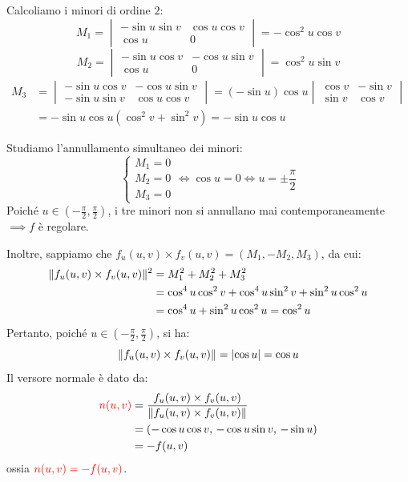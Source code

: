 \begin{esempio}
        Calcoliamo i minori di ordine $2$:
        \[
        M_1 = 
        \begin{vmatrix}
        -\sin u \sin v & \cos u \cos v \\[6pt]
        \cos u & 0
        \end{vmatrix} 
        = -\cos^2 u \cos v
        \]
        \[
        M_2 = 
        \begin{vmatrix}
        -\sin u \cos v & -\cos u \sin v \\[6pt]
        \cos u & 0
        \end{vmatrix} 
        = \cos^2 u \sin v
        \]
        \begin{align*}
        M_3 &= 
        \begin{vmatrix}
        -\sin u \cos v & -\cos u \sin v \\[6pt]
        -\sin u \sin v & \cos u \cos v
        \end{vmatrix} 
        = (-\sin u)\cos u 
        \begin{vmatrix}
        \cos v & -\sin v \\[6pt]
        \sin v & \cos v
        \end{vmatrix} \\[6pt]
        &= -\sin u \cos u (\cos^2 v + \sin^2 v) = -\sin u \cos u
        \end{align*}

        Studiamo l'annullamento simultaneo dei minori:
        \[
        \begin{cases}
        M_1 = 0 \\
        M_2 = 0 \\
        M_3 = 0
        \end{cases}
        \iff \cos u = 0 \iff u = \pm \frac{\pi}{2}
        \]
        Poiché $u \in \left(-\frac{\pi}{2}, \frac{\pi}{2}\right)$, i tre minori non si annullano mai contemporaneamente $\implies f$ è regolare.

        Inoltre, sappiamo che $f_u(u,v) \times f_v(u,v) = (M_1, -M_2, M_3)$, da cui:
        \begin{align*}
        \lVert f_u(u,v) \times f_v(u,v)\rVert^2 &= M_1^2 + M_2^2 + M_3^2 \\
        &= \cos^4 u \cos^2 v + \cos^4 u \sin^2 v + \sin^2 u \cos^2 u \\
        &= \cos^4 u + \sin^2 u \cos^2 u = \cos^2 u
        \end{align*}
        Pertanto, poiché $u \in \left(-\frac{\pi}{2}, \frac{\pi}{2}\right)$, si ha:
        \[
        \lVert f_u(u,v) \times f_v(u,v)\rVert = \lvert\cos u\rvert = \cos u
        \]
        Il versore normale è dato da:
        \begin{align*}
        \textcolor{red}{n(u,v)} &= \frac{f_u(u,v) \times f_v(u,v)}{\lVert f_u(u,v) \times f_v(u,v)\rVert} \\
        &= (-\cos u \cos v, \, -\cos u \sin v, \, -\sin u) \\
        &= -f(u,v)
        \end{align*}
        ossia $\textcolor{red}{n(u,v) = -f(u,v)}$.


\end{esempio}
